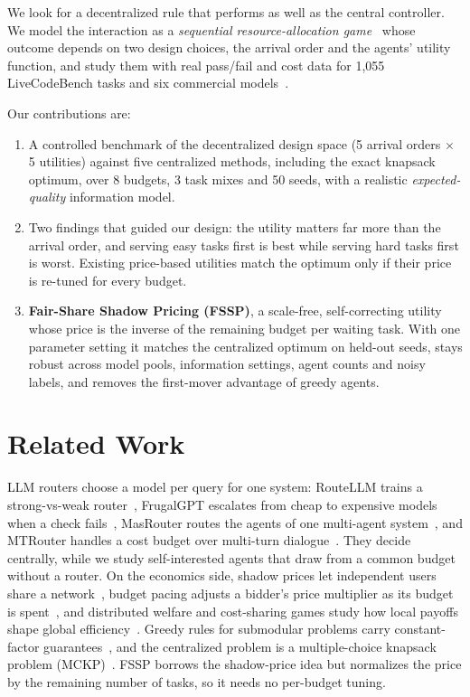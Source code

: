 \documentclass{article}
\begin{document}
We look for a decentralized rule that performs as well as the central controller. We model the interaction as a \emph{sequential resource-allocation game}~\cite{nisan2007algorithmic} whose outcome depends on two design choices, the arrival order and the agents' utility function, and study them with real pass/fail and cost data for 1,055 LiveCodeBench tasks and six commercial models~\cite{llmrouterbench,jain2024livecodebench}.

Our contributions are:
\begin{enumerate}[leftmargin=*, itemsep=1pt]
  \item A controlled benchmark of the decentralized design space (5 arrival orders $\times$ 5 utilities) against five centralized methods, including the exact knapsack optimum, over 8 budgets, 3 task mixes and 50 seeds, with a realistic \emph{expected-quality} information model.
  \item Two findings that guided our design: the utility matters far more than the arrival order, and serving easy tasks first is best while serving hard tasks first is worst. Existing price-based utilities match the optimum only if their price is re-tuned for every budget.
  \item \textbf{Fair-Share Shadow Pricing (FSSP)}, a scale-free, self-correcting utility whose price is the inverse of the remaining budget per waiting task. With one parameter setting it matches the centralized optimum on held-out seeds, stays robust across model pools, information settings, agent counts and noisy labels, and removes the first-mover advantage of greedy agents.
\end{enumerate}

\section{Related Work}

LLM routers choose a model per query for one system: RouteLLM trains a strong-vs-weak router~\cite{ong2024routellm}, FrugalGPT escalates from cheap to expensive models when a check fails~\cite{chen2023frugalgpt}, MasRouter routes the agents of one multi-agent system~\cite{yue2025masrouter}, and MTRouter handles a cost budget over multi-turn dialogue~\cite{zhang2026mtrouter}. They decide centrally, while we study self-interested agents that draw from a common budget without a router. On the economics side, shadow prices let independent users share a network~\cite{kelly1998rate}, budget pacing adjusts a bidder's price multiplier as its budget is spent~\cite{balseiro2019learning}, and distributed welfare and cost-sharing games study how local payoffs shape global efficiency~\cite{marden2013distributed,chandan2019optimal}. Greedy rules for submodular problems carry constant-factor guarantees~\cite{nemhauser1978analysis,williams2017decentralised}, and the centralized problem is a multiple-choice knapsack problem (MCKP)~\cite{kellerer2004knapsack}. FSSP borrows the shadow-price idea but normalizes the price by the remaining number of tasks, so it needs no per-budget tuning.
\end{document}
